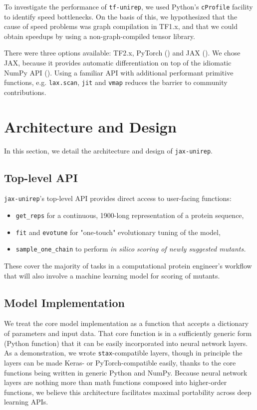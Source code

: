 \documentclass[twoside,11pt]{article}
\begin{document}
To investigate the performance of \verb|tf-unirep|,
we used Python's \verb|cProfile| facility to identify speed bottlenecks.
On the basis of this, we hypothesized that the cause of speed problems
was graph compilation in TF1.x,
and that we could obtain speedups by using
a non-graph-compiled tensor library.

There were three options available: TF2.x, PyTorch (\cite{pytorch})
and JAX (\cite{jax2018github}).
We chose JAX, because it provides automatic differentiation
on top of the idiomatic NumPy API (\cite{oliphant2006guide}).
Using a familiar API with additional performant primitive functions,
e.g. \verb|lax.scan|, \verb|jit| and \verb|vmap|
reduces the barrier to community contributions.


\section{Architecture and Design}

In this section, we detail the architecture and design
of \verb|jax-unirep|.

\subsection{Top-level API}

\verb|jax-unirep|'s top-level API provides direct access
to user-facing functions:

\begin{itemize}
	\item \verb|get_reps| for a continuous, 1900-long representation of a protein sequence,
	\item \verb|fit| and \verb|evotune| for "one-touch" evolutionary tuning of the model,
	\item \verb|sample_one_chain| to perform \it{in silico} scoring of newly suggested mutants.
\end{itemize}

These cover the majority of tasks in a computational protein engineer's workflow
that will also involve a machine learning model for scoring of mutants.

\subsection{Model Implementation}

We treat the core model implementation as a function
that accepts a dictionary of parameters and input data.
That core function is in a sufficiently generic form (Python function)
that it can be easily incorporated into neural network layers.
As a demonstration, we wrote \verb|stax|-compatible layers,
though in principle the layers can be made Keras- or PyTorch-compatible easily,
thanks to the core functions being written in generic Python and NumPy.
Because neural network layers are nothing more than math functions
composed into higher-order functions,
we believe this architecture facilitates maximal portability
across deep learning APIs.
\end{document}
